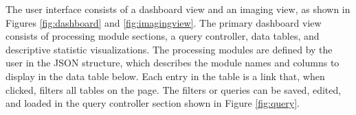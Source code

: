 The user interface consists of a dashboard view and an imaging view, as shown in Figures \ref{fig:dashboard} and \ref{fig:imagingview}. The primary dashboard view consists of processing module sections, a query controller, data tables, and descriptive statistic visualizations. The processing modules are defined by the user in the JSON structure, which describes the module names and columns to display in the data table below. Each entry in the table is a link that, when clicked, filters all tables on the page. The filters or queries can be saved, edited, and loaded in the query controller section shown in Figure \ref{fig:query}. 